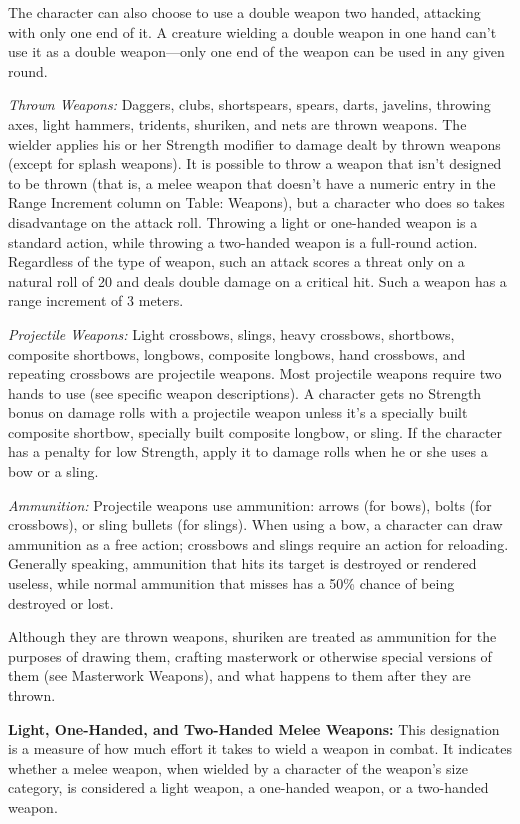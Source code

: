 The character can also choose to use a double weapon two handed, attacking with only one end of it. A creature wielding a double weapon in one hand can't use it as a double weapon---only one end of the weapon can be used in any given round.

\textit{Thrown Weapons:} Daggers, clubs, shortspears, spears, darts, javelins, throwing axes, light hammers, tridents, shuriken, and nets are thrown weapons. The wielder applies his or her Strength modifier to damage dealt by thrown weapons (except for splash weapons). It is possible to throw a weapon that isn't designed to be thrown (that is, a melee weapon that doesn't have a numeric entry in the Range Increment column on Table: Weapons), but a character who does so takes disadvantage on the attack roll. Throwing a light or one-handed weapon is a standard action, while throwing a two-handed weapon is a full-round action. Regardless of the type of weapon, such an attack scores a threat only on a natural roll of 20 and deals double damage on a critical hit. Such a weapon has a range increment of 3 meters.

\textit{Projectile Weapons:} Light crossbows, slings, heavy crossbows, shortbows, composite shortbows, longbows, composite longbows, hand crossbows, and repeating crossbows are projectile weapons. Most projectile weapons require two hands to use (see specific weapon descriptions). A character gets no Strength bonus on damage rolls with a projectile weapon unless it's a specially built composite shortbow, specially built composite longbow, or sling. If the character has a penalty for low Strength, apply it to damage rolls when he or she uses a bow or a sling.

\textit{Ammunition:} Projectile weapons use ammunition: arrows (for bows), bolts (for crossbows), or sling bullets (for slings). When using a bow, a character can draw ammunition as a free action; crossbows and slings require an action for reloading. Generally speaking, ammunition that hits its target is destroyed or rendered useless, while normal ammunition that misses has a 50\% chance of being destroyed or lost.

Although they are thrown weapons, shuriken are treated as ammunition for the purposes of drawing them, crafting masterwork or otherwise special versions of them (see Masterwork Weapons), and what happens to them after they are thrown.

\textbf{Light, One-Handed, and Two-Handed Melee Weapons:} This designation is a measure of how much effort it takes to wield a weapon in combat. It indicates whether a melee weapon, when wielded by a character of the weapon's size category, is considered a light weapon, a one-handed weapon, or a two-handed weapon.

